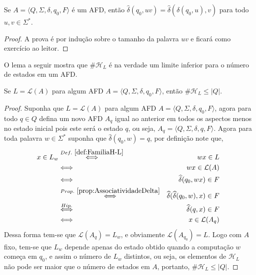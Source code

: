 \begin{prop}\label{prop:AssociatividadeDelta}
	Se $A = \langle Q, \Sigma, \delta, q_0, F\rangle$ é um AFD, então $\widehat{\delta}(q_0, uv) = \widehat{\delta}( \widehat{\delta}(q_0, u), v)$ para todo $u,v \in \Sigma^*$.
\end{prop}

\begin{proof}
	A prova é por indução sobre o tamanho da palavra $uv$ e ficará como exercício ao leitor.
\end{proof}

O lema a seguir mostra que $\# \mathcal{H}_L$ é na verdade um limite inferior para o número de estados em um AFD. 

\begin{lema}\label{lema:LimiteInferiorEstados}
	Se $L = \mathcal{L}(A)$ para algum AFD $A = \langle Q, \Sigma, \delta, q_0, F\rangle$, então $\# \mathcal{H}_L \leq |Q|$.
\end{lema}

\begin{proof}
	Suponha que $L = \mathcal{L}(A)$ para algum AFD $A = \langle Q, \Sigma, \delta, q_0, F\rangle$, agora para todo $q \in Q$ defina um novo AFD $A_q$ igual ao anterior em todos os aspectos menos no estado inicial pois este será o estado $q$, ou seja,  $A_q = \langle Q, \Sigma, \delta, q, F\rangle$. Agora para toda palavra $w \in \Sigma^*$ suponha que $\widehat{\delta}(q_0, w) = q$, por definição note que, 
	\begin{eqnarray*}
		x \in L_w & \stackrel{Def. \ \ref{def:FamiliaH-L}}{\Longleftrightarrow} & wx \in L\\
		& \Longleftrightarrow & wx \in \mathcal{L}(A)\\
		& \Longleftrightarrow & \widehat{\delta}(q_0, wx) \in F\\
		& \stackrel{Prop. \ \ref{prop:AssociatividadeDelta}}{\Longleftrightarrow} & \widehat{\delta}(\widehat{\delta}(q_0, w), x) \in F\\
		& \stackrel{Hip.}{\Longleftrightarrow} & \widehat{\delta}(q, x) \in F\\
		& \Longleftrightarrow & x \in \mathcal{L}(A_q)
	\end{eqnarray*}
	Dessa forma tem-se que $\mathcal{L}(A_q) = L_w$, e obviamente $\mathcal{L}(A_{q_0}) = L$. Logo com $A$ fixo, tem-se que $L_w$ depende apenas do estado obtido quando a computação $w$ começa em $q_0$, e assim o número de $L_w$ distintos, ou seja, os elementos de $\mathcal{H}_L$ não pode ser maior que o número de estados em $A$, portanto, $\#\mathcal{H}_L \leq |Q|$.
\end{proof}

